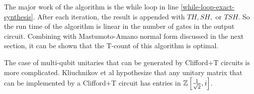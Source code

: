 The major work of the algorithm is the while loop in line \ref{while-loop-exact-synthesis}.
After each iteration, the result is appended with $TH, SH, $ or $TSH$. 
So the run time of the algorithm is linear in the number of gates in the output circuit.
Combining with Mastumoto-Amano normal form discussed in the next section, it can be shown that the T-count of this algorithm is optimal.

The case of multi-qubit unitaries that can be generated by Clifford+T circuits is more complicated. 
Kliuchnikov et al hypothesize that any unitary matrix that can be implemented by a Clifford+T circuit has entries in $\mathbb{Z}\left[\frac{1}{\sqrt{2}}, i\right]$.
